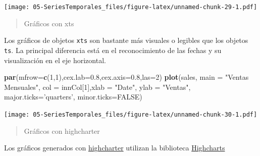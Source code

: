 \documentclass[]{book}
\newenvironment{Shaded}{\begin{snugshade}}{\end{snugshade}}
\newcommand{\DataTypeTok}[1]{\textcolor[rgb]{0.13,0.29,0.53}{#1}}
\newcommand{\DecValTok}[1]{\textcolor[rgb]{0.00,0.00,0.81}{#1}}
\newcommand{\FloatTok}[1]{\textcolor[rgb]{0.00,0.00,0.81}{#1}}
\newcommand{\KeywordTok}[1]{\textcolor[rgb]{0.13,0.29,0.53}{\textbf{#1}}}
\newcommand{\NormalTok}[1]{#1}
\newcommand{\OtherTok}[1]{\textcolor[rgb]{0.56,0.35,0.01}{#1}}
\newcommand{\StringTok}[1]{\textcolor[rgb]{0.31,0.60,0.02}{#1}}
\begin{document}
\texttt{[image: 05-SeriesTemporales\_files/figure-latex/unnamed-chunk-29-1.pdf]}

\begin{quote}
Gráficos con xts
\end{quote}

Los gráficos de objetos \texttt{xts} son bastante más visuales o legibles que los objetos \texttt{ts}. La principal diferencia está en el reconocimiento de las fechas y su visualización en el eje horizontal.

\begin{Shaded}
\begin{Highlighting}[]
\KeywordTok{par}\NormalTok{(}\DataTypeTok{mfrow=}\KeywordTok{c}\NormalTok{(}\DecValTok{1}\NormalTok{,}\DecValTok{1}\NormalTok{),}\DataTypeTok{cex.lab=}\FloatTok{0.8}\NormalTok{,}\DataTypeTok{cex.axis=}\FloatTok{0.8}\NormalTok{,}\DataTypeTok{las=}\DecValTok{2}\NormalTok{)}
\KeywordTok{plot}\NormalTok{(sales, }\DataTypeTok{main =} \StringTok{"Ventas Mensuales"}\NormalTok{,}
     \DataTypeTok{col =}\NormalTok{ innCol[}\DecValTok{1}\NormalTok{],}\DataTypeTok{xlab =} \StringTok{"Date"}\NormalTok{, }\DataTypeTok{ylab =} \StringTok{"Ventas"}\NormalTok{, }\DataTypeTok{major.ticks=}\StringTok{'quarters'}\NormalTok{,}
     \DataTypeTok{minor.ticks=}\OtherTok{FALSE}\NormalTok{)}
\end{Highlighting}
\end{Shaded}

\texttt{[image: 05-SeriesTemporales\_files/figure-latex/unnamed-chunk-30-1.pdf]}

\begin{quote}
Gráficos con highcharter
\end{quote}

Los gráficos generados con \href{http://jkunst.com/highcharter/index.html}{highcharter} utilizan la biblioteca \href{http://www.highcharts.com/demo}{Highcharts}
\end{document}
